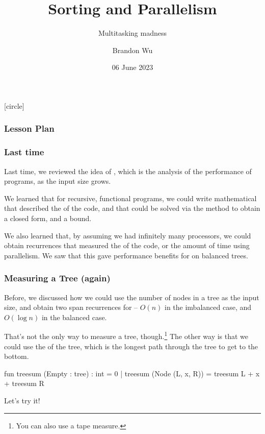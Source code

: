 \documentclass[aspectratio=169, handout]{beamer}
\title{Sorting and Parallelism} %
\subtitle{Multitasking madness} %
\date{06 June 2023} %
\author{Brandon Wu} %
\newif\ifcolorlambda
\begin{document}
\ifweb
    \renewcommand{\pause}{}
\fi

[circle]

{
\begin{frame}[plain]
    \colorlambdatrue
    \titlepage
\end{frame}
}

\begin{frame}[fragile]
  \frametitle{Lesson Plan}

  \tableofcontents
\end{frame}

\begin{frame}[fragile]
  \frametitle{Last time}

  Last time, we reviewed the idea of , which is the analysis
  of the performance of programs, as the input size grows.

  \pause
  \vspace{\fill}

  We learned that for recursive, functional programs, we could write mathematical
   that described the  of the code, and that could be solved
  via the  method to obtain a closed form, and a bound.

  \pause
  \vspace{\fill}

  We also learned that, by assuming we had infinitely many processors, we could
  obtain recurrences that measured the  of the code, or the amount of time
  using parallelism. We saw that this gave performance benefits for  on
  balanced trees.
\end{frame}


\begin{frame}[fragile]
  \frametitle{Measuring a Tree (again)}

  Before, we discussed how we could use the number of nodes in a tree as the input
  size, and obtain two span recurrences for  -- $O(n)$ in the imbalanced
  case, and $O(\log n)$ in the balanced case.

  \pause
  \vspace{\fill}

  That's not the only way to measure a tree, though.\footnote{You can also use a tape measure.} The other way is that we could
  use the  of the tree, which is the longest path through the tree to
  get to the bottom.

  \pause
  \vspace{\fill}

  \begin{codeblock}
    fun treesum (Empty : tree) : int = 0
      | treesum (Node (L, x, R)) = treesum L + x + treesum R
  \end{codeblock}

  \vspace{\fill}

  Let's try it!
\end{frame}
\end{document}
